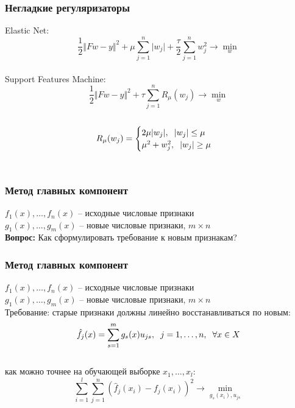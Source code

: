 \documentclass[10pt]{beamer}
\begin{document}
\begin{frame}\frametitle{Негладкие регуляризаторы}
	Elastic Net:\\
	$$\frac{1}{2} \Vert Fw - y \Vert^2 + \mu \sum\limits_{j=1}^n \vert w_j \vert + \frac{\tau}{2} \sum\limits_{j=1}^n w_j^2 \rightarrow \min\limits_{w}$$\\
	Support Features Machine:\\
	$$\frac{1}{2} \Vert Fw - y \Vert^2 + \tau \sum\limits_{j=1}^n R_{\mu}(w_j) \rightarrow \min\limits_{w}$$\\
	$$ R_{\mu}(w_j) = \begin{cases} 2 \mu \vert w_j \vert, \hspace{2mm} \vert w_j \vert \leq \mu\\
	\mu^2 + w_j^2, \hspace{2mm} \vert w_j \vert \geq \mu
	\end{cases}$$\\
\end{frame}

\begin{frame}\frametitle{Метод главных компонент}
	$f_1(x), \dots, f_n(x)$ -- исходные числовые признаки\\
	$g_1(x), \dots, g_m(x)$ -- новые числовые признаки, $m \times n$\\
	\bigbreak
	\textbf{Вопрос:} Как сформулировать требование к новым признакам?
\end{frame}

\begin{frame}\frametitle{Метод главных компонент}
	$f_1(x), \dots, f_n(x)$ -- исходные числовые признаки\\
	$g_1(x), \dots, g_m(x)$ -- новые числовые признаки, $m \times n$\\
	Требование: старые признаки должны линейно
	восстанавливаться по новым:\\
	$$\hat{f}_j(x) = \sum\limits_{s=1}^m g_s(x) u_{js} , \hspace{2mm} j = 1,\dots , n, \hspace{2mm} \forall x \in X$$\\
	как можно точнее на обучающей выборке $x_1, \dots, x_l$:\\
	$$\sum\limits_{i=1}^l \sum\limits_{j=1}^n (\hat{f}_j(x_i) - f_j(x_i))^2 \rightarrow \min\limits_{g_s(x_i), u_{js}}$$
\end{frame}
\end{document}
